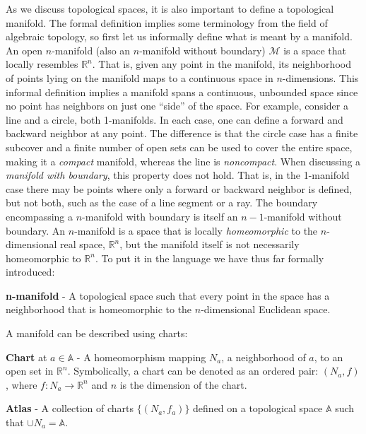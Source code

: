 As we discuss topological spaces, it is also important to define a topological manifold.
%
The formal definition implies some terminology from the field of algebraic topology, so first let us informally define what is meant by a manifold.
%
An open $n$-manifold (also an $n$-manifold without boundary) $\mathcal{M}$ is a space that locally resembles $\mathbb{R}^n$.
%
That is, given any point in the manifold, its neighborhood of points lying on the manifold maps to a continuous space in $n$-dimensions.
%
This informal definition implies a manifold spans a continuous, unbounded space since no point has neighbors on just one ``side'' of the space.
%
For example, consider a line and a circle, both 1-manifolds.
%
In each case, one can define a forward and backward neighbor at any point.
%
The difference is that the circle case has a finite subcover and a finite number of open sets can be used to cover the entire space, making it a \emph{compact} manifold, whereas the line is \emph{noncompact}.
%
When discussing a \emph{manifold with boundary}, this property does not hold.
%
That is, in the 1-manifold case there may be points where only a forward or backward neighbor is defined, but not both, such as the case of a line segment or a ray.
%
The boundary encompassing a $n$-manifold with boundary is itself an $n-1$-manifold without boundary.
%
An $n$-manifold is a space that is locally \emph{homeomorphic} to the $n$-dimensional real space, $\mathbb{R}^n$, but the manifold itself is not necessarily homeomorphic to $\mathbb{R}^n$.
%
To put it in the language we have thus far formally introduced:

\begin{defn}
  \textbf{n-manifold} - A topological space such that every point in the space has a neighborhood that is homeomorphic to the $n$-dimensional Euclidean space.
\end{defn}

A manifold can be described using charts:

\begin{defn}
  \textbf{Chart} at $a \in \mathbb{A}$ - A homeomorphism mapping $N_a$, a neighborhood of $a$, to an open set in $\mathbb{R}^n$. Symbolically, a chart can be denoted as an ordered pair: $(N_a,f)$, where $f: N_a \rightarrow \mathbb{R}^n$ and $n$ is the dimension of the chart.
\end{defn}

\begin{defn}
  \textbf{Atlas} - A collection of charts $\{(N_a,f_a)\}$ defined on a topological space $\mathbb{A}$ such that $\cup N_a = \mathbb{A}$.
\end{defn}

